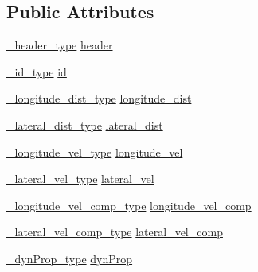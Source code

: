 \subsection*{Public Attributes}
\begin{DoxyCompactItemize}
\item 
\hyperlink{structconti__radar_1_1ContiRadar___a0e76e7ae9ddced00c45c5935daea918f}{\+\_\+header\+\_\+type} \hyperlink{structconti__radar_1_1ContiRadar___a4ec2177958e962e3bceb7fec73485c9d}{header}
\item 
\hyperlink{structconti__radar_1_1ContiRadar___aa24d813acf1184f22dbd33d1301d8887}{\+\_\+id\+\_\+type} \hyperlink{structconti__radar_1_1ContiRadar___a081e0cd214173e4dbaf4ca61e7870a2b}{id}
\item 
\hyperlink{structconti__radar_1_1ContiRadar___a165d35c3e291b895e03290883feaf8a9}{\+\_\+longitude\+\_\+dist\+\_\+type} \hyperlink{structconti__radar_1_1ContiRadar___a46f5735ad71a280786f8c9b7bc59d3ee}{longitude\+\_\+dist}
\item 
\hyperlink{structconti__radar_1_1ContiRadar___a2c5d5de6c5ec7dc7b53d84802b54d522}{\+\_\+lateral\+\_\+dist\+\_\+type} \hyperlink{structconti__radar_1_1ContiRadar___acb29fb122326eddc34e85f76e80690e4}{lateral\+\_\+dist}
\item 
\hyperlink{structconti__radar_1_1ContiRadar___af042240d6e52b741e4a641e13e8c0b09}{\+\_\+longitude\+\_\+vel\+\_\+type} \hyperlink{structconti__radar_1_1ContiRadar___aae3f89b4d43e205ec1f19af76a4d9554}{longitude\+\_\+vel}
\item 
\hyperlink{structconti__radar_1_1ContiRadar___aa5af25dc9a77913381d78b94f4655ad5}{\+\_\+lateral\+\_\+vel\+\_\+type} \hyperlink{structconti__radar_1_1ContiRadar___a1ce1ced708e36eb9c6f2ade45a731774}{lateral\+\_\+vel}
\item 
\hyperlink{structconti__radar_1_1ContiRadar___a3f85fb9d65be899731b3261b3e788197}{\+\_\+longitude\+\_\+vel\+\_\+comp\+\_\+type} \hyperlink{structconti__radar_1_1ContiRadar___a5f56de1387fecff209fc81f5097703b9}{longitude\+\_\+vel\+\_\+comp}
\item 
\hyperlink{structconti__radar_1_1ContiRadar___af4091d74d21fafb513e0815764836f98}{\+\_\+lateral\+\_\+vel\+\_\+comp\+\_\+type} \hyperlink{structconti__radar_1_1ContiRadar___a23c166083e35d055062136e34f8cf5fb}{lateral\+\_\+vel\+\_\+comp}
\item 
\hyperlink{structconti__radar_1_1ContiRadar___aa7a6bebffccc2d73549b176d1230e1dc}{\+\_\+dyn\+Prop\+\_\+type} \hyperlink{structconti__radar_1_1ContiRadar___aa218a3655575785cf14052b9f41eb53e}{dyn\+Prop}

\end{DoxyCompactItemize}
